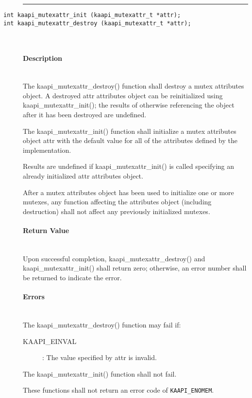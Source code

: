 \begin{description}
\vspace*{3ex} \hrule width 4cm
\vspace*{3ex}
\item [\texttt{int kaapi\_mutexattr\_init (kaapi\_mutexattr\_t *attr);}]
\item [\texttt{int kaapi\_mutexattr\_destroy (kaapi\_mutexattr\_t *attr);}]~\\

\paragraph{Description}~\\
The kaapi\_mutexattr\_destroy() function shall destroy a mutex attributes
object. A destroyed attr attributes object can be reinitialized using
kaapi\_mutexattr\_init(); the results of otherwise referencing the object
after it has been destroyed are undefined.

The kaapi\_mutexattr\_init() function shall initialize a mutex attributes
object attr with the default value for all of the attributes defined by the
implementation.

Results are undefined if kaapi\_mutexattr\_init() is called specifying an
already initialized attr attributes object.

After a mutex attributes object has been used to initialize one or more
mutexes, any function affecting the attributes object (including destruction)
shall not affect any previously initialized mutexes.

\paragraph{Return Value}~\\
Upon successful completion, kaapi\_mutexattr\_destroy() and
kaapi\_mutexattr\_init() shall return zero; otherwise, an error number shall
be returned to indicate the error.

\paragraph{Errors}~\\
The kaapi\_mutexattr\_destroy() function may fail if:

\begin{description}
\item [KAAPI\_EINVAL]: The value specified by attr is invalid.
\end{description}

The kaapi\_mutexattr\_init() function shall not fail.

These functions shall not return an error code of \verb+KAAPI_ENOMEM+.
\end{description}

